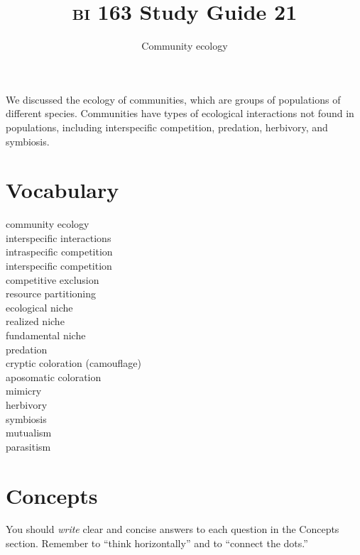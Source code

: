 \documentclass[letterpaper]{tufte-handout}
\title{{\scshape bi} 163 Study Guide 21}
\author{Community ecology}
\date{} %
\begin{document}
\maketitle	%

We discussed the ecology of communities, which are groups of populations of different species.  Communities have types of ecological interactions not found in populations, including interspecific competition, predation, herbivory, and symbiosis.

\section*{Vocabulary}

\vspace{-1\baselineskip}
\begin{multicols}{2}
community ecology\\
interspecific interactions\\
intraspecific competition\\
interspecific competition\\
competitive exclusion\\
resource partitioning\\
ecological niche\\
realized niche\\
fundamental niche\\
predation \\
cryptic coloration (camouflage)\\
aposomatic coloration\\
mimicry\\
herbivory \\
symbiosis\\
mutualism\\
parasitism
\end{multicols}

\section*{Concepts}

You should \emph{write} clear and concise answers to each question in the Concepts section.  Remember to ``think horizontally'' and to ``connect the dots.'' 
\end{document}
